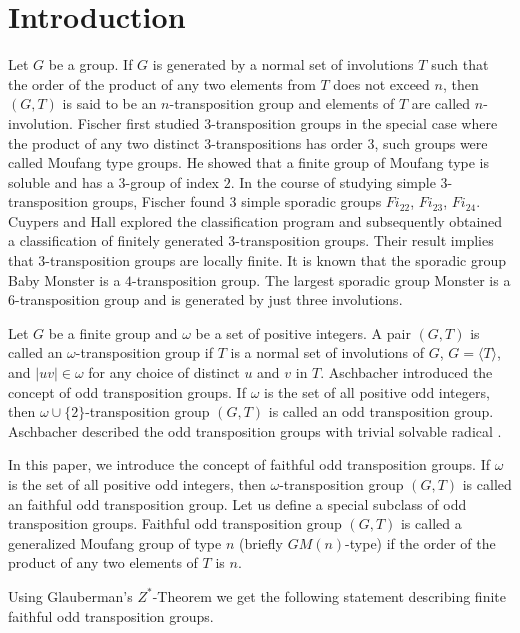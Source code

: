 \documentclass[12pt]{article}
\newcommand\la{\langle}
\newcommand\ra{\rangle}
\begin{document}
\section*{Introduction}
%	
Let $G$	be a group.	If $G$ is generated by a normal set of involutions $T$ such that the order of the product of any two elements from $T$ does not exceed $n$, then $(G,T)$ is said to be an $n$-transposition group and elements of $T$ are called $n$-involution.
	Fischer \cite{Fi64} first studied $3$-transposition groups in the special case where the product of any two distinct $3$-transpositions has order $3$, such groups were called Moufang type groups. He showed that a finite group of Moufang type is soluble and has a $3$-group of index $2$. In the course of studying simple $3$-transposition groups, Fischer \cite{Fi71} found 3 simple sporadic groups $Fi_{22}$, $Fi_{23}$, $Fi_{24}$. Cuypers and Hall \cite{CH95} explored the classification program and subsequently obtained a classification of finitely generated $3$-transposition groups. Their result implies that $3$-transposition groups are locally finite. It is known that the sporadic group Baby Monster is a $4$-transposition group. The largest sporadic group Monster is a $6$-transposition group and is generated by just three involutions.
	
	Let $G$ be a finite group and $\omega$ be a set of positive integers. A pair $(G, T)$ is called an $\omega$-transposition group if $T$ is a normal set of involutions of $G$, $G= \la T\ra$, and	$|uv|\in \omega $ for any choice of distinct $u$ and $v$ in $T$.
	Aschbacher \cite{Ash2} introduced the concept of odd transposition groups. If $\omega$ is the set of all positive odd integers, then $\omega\cup\{2\}$-transposition group $(G, T)$ is called an odd transposition group. Aschbacher described the odd transposition groups with trivial solvable radical \cite{Ash2}.
	
	In this paper, we introduce the concept of faithful odd transposition groups. If $\omega$ is the set of all positive odd integers, then $\omega$-transposition group $(G, T)$ is called an faithful odd transposition group. 
	Let us define a special subclass of odd transposition groups. Faithful odd transposition group $(G,T)$ is called a generalized Moufang group of type $n$ (briefly $GM(n)$-type) if the order of the product of any two elements of $T$ is $n$.
	
	Using Glauberman's $Z^*$-Theorem we get the following statement describing finite faithful odd transposition groups. 
	
\end{document}
